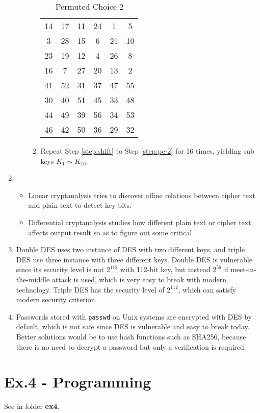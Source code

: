 \documentclass[12pt]{article}
\begin{document}
\begin{enumerate}
\begin{itemize}
\begin{enumerate}
						\begin{table}[hbtp]
							\centering
							\begin{tabular}{cccccc}
								14 & 17 & 11 & 24 &  1 &  5\\
								 3 & 28 & 15 &  6 & 21 & 10\\
								23 & 19 & 12 &  4 & 26 &  8\\
								16 &  7 & 27 & 20 & 13 &  2\\
								41 & 52 & 31 & 37 & 47 & 55\\
								30 & 40 & 51 & 45 & 33 & 48\\
								44 & 49 & 39 & 56 & 34 & 53\\
								46 & 42 & 50 & 36 & 29 & 32\\
							\end{tabular}
							\caption{Permuted Choice 2}
							\label{tab:pc-2}
						\end{table}
					\item Repeat Step \ref{step:shift} to Step \ref{step:pc-2} for 16 times, yielding sub keys $K_1 \sim K_{16}$.
				\end{enumerate}
		\end{itemize}
	\item
		\begin{itemize}
			\item Linear cryptanalysis tries to discover affine relations between cipher text and plain text to detect key bits.
			\item Differential cryptanalysis studies how different plain text or cipher text affects output result so as to figure out some critical
		\end{itemize}
	\item
		Double DES uses two instance of DES with two different keys, and triple DES use three instance with three different keys. Double DES is vulnerable since its security level is not $2^{112}$ with 112-bit key, but instead $2^{56}$ if meet-in-the-middle attack is used, which is very easy to break with modern technology. Triple DES has the security level of $2^{112}$, which can satisfy modern security criterion.
	\item
		Passwords stored with \texttt{passwd} on Unix systems are encrypted with DES by default, which is not safe since DES is vulnerable and easy to break today. Better solutions would be to use hash functions such as SHA256, because there is no need to decrypt a password but only a verification is required.
\end{enumerate}

\section*{Ex.4 - Programming}

See in folder \textbf{ex4}.
\end{document}
